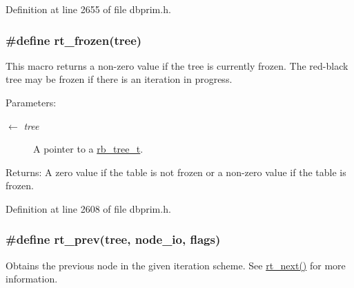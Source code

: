 Definition at line 2655 of file dbprim.h.\hypertarget{group__dbprim__rbtree_ga19}{
\subsubsection[rt\_\-frozen]{\setlength{\rightskip}{0pt plus 5cm}\#define rt\_\-frozen(tree)}}
\label{group__dbprim__rbtree_ga19}


This macro returns a non-zero value if the tree is currently frozen. The red-black tree may be frozen if there is an iteration in progress.

\begin{Desc}
\item[Parameters:]
\begin{description}
\item[\mbox{$\leftarrow$} {\em tree}]A pointer to a \hyperlink{group__dbprim__rbtree_ga0}{rb\_\-tree\_\-t}.\end{description}
\end{Desc}
\begin{Desc}
\item[Returns:]A zero value if the table is not frozen or a non-zero value if the table is frozen.\end{Desc}


Definition at line 2608 of file dbprim.h.\hypertarget{group__dbprim__rbtree_ga28}{
\subsubsection[rt\_\-prev]{\setlength{\rightskip}{0pt plus 5cm}\#define rt\_\-prev(tree, node\_\-io, flags)}}
\label{group__dbprim__rbtree_ga28}


Obtains the previous node in the given iteration scheme. See \hyperlink{group__dbprim__rbtree_ga10}{rt\_\-next()} for more information.

